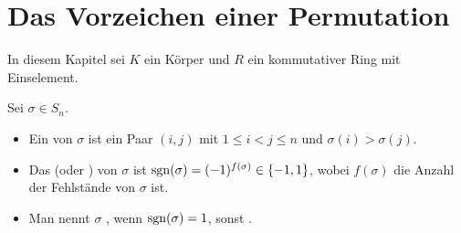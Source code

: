 \section{Das Vorzeichen einer Permutation}

In diesem Kapitel sei $K$ ein Körper und $R$ ein kommutativer Ring mit Einselement.

\begin{definition}
	Sei $\sigma\in S_n$.
	\begin{itemize}
		\item Ein  von $\sigma$ ist ein Paar $(i,j)$ mit $1\le i<j\le n$ und $\sigma(i)>\sigma(j)$.
		\item Das  (oder ) von $\sigma$ ist $\operatorname{sgn}(\sigma)=(-1)^{f(\sigma)}\in \{-1,1\}$, wobei $f(\sigma)$ die 
		Anzahl der Fehlstände von $\sigma$ ist.
		\item Man nennt $\sigma$ , wenn $\operatorname{sgn}(\sigma)=1$, sonst .
	\end{itemize}
\end{definition}